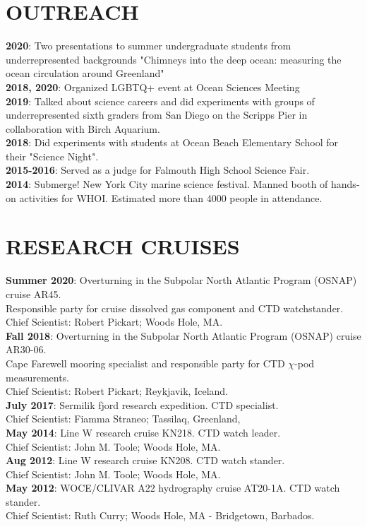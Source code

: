 \documentclass[paper=letter,fontsize=11pt]{scrartcl} %
\newcommand{\NewPart}[2]{\section*{\uppercase{#1} #2}}
\newcommand{\ShortEntry}[2]{\normalsize \noindent \textbf{#1}: #2 \\ }
\begin{document}
\NewPart{Outreach}{}
\ShortEntry{2020}{Two presentations to summer undergraduate students from underrepresented backgrounds "Chimneys into the deep ocean: measuring the ocean circulation around Greenland"}
\ShortEntry{2018, 2020}{Organized LGBTQ+ event at Ocean Sciences Meeting}
\ShortEntry{2019}{Talked about science careers and did experiments with groups of underrepresented sixth graders from San Diego on the Scripps Pier in collaboration with Birch Aquarium.}
\ShortEntry{2018}{Did experiments with students at Ocean Beach Elementary School for their "Science Night".}
\ShortEntry{2015-2016}{Served as a judge for Falmouth High School Science Fair.}
\ShortEntry{2014}{Submerge! New York City marine science festival. Manned booth of hands-on activities for WHOI. Estimated more than 4000 people in attendance.}

\NewPart{Research Cruises}{}

\ShortEntry{Summer 2020}{Overturning in the Subpolar North Atlantic Program (OSNAP) cruise AR45.\\ Responsible party for cruise dissolved gas component and CTD watchstander.\\ Chief Scientist: Robert Pickart; Woods Hole, MA.}

\ShortEntry{Fall 2018}{Overturning in the Subpolar North Atlantic Program (OSNAP) cruise AR30-06.\\ Cape Farewell mooring specialist and responsible party for CTD $\chi$-pod measurements.\\ Chief Scientist: Robert Pickart; Reykjavik, Iceland.}

\ShortEntry{July 2017}{Sermilik fjord research expedition. CTD specialist.\\ Chief Scientist: Fiamma Straneo; Tassilaq, Greenland,}

\ShortEntry{May 2014}{Line W research cruise KN218. CTD watch leader.\\ Chief Scientist: John M. Toole; Woods Hole, MA.}

\ShortEntry{Aug 2012}{Line W research cruise KN208. CTD watch stander.\\ Chief Scientist: John M. Toole; Woods Hole, MA.}

\ShortEntry{May 2012}{WOCE/CLIVAR A22 hydrography cruise AT20-1A. CTD watch stander.\\ Chief Scientist: Ruth Curry; Woods Hole, MA - Bridgetown, Barbados.}
\end{document}
